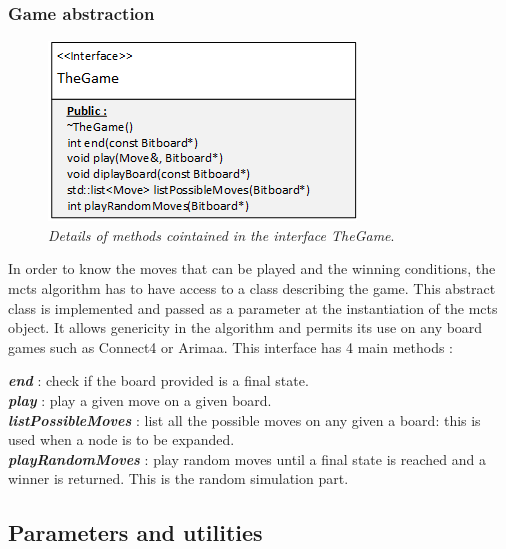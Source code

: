 \subsubsection{Game abstraction}
\begin{figure}[H] 
\centerline{\includegraphics[scale=0.8]{Data_Structure/Img/TheGame.png}}
\caption{\label{fig:thegamedetails}\textit{Details of methods cointained in the interface TheGame}.}
\end{figure}
In order to know the moves that can be played and the winning conditions, the mcts algorithm has to have access to a class describing the game. This abstract class is implemented and passed as a parameter at the instantiation of the mcts object. It allows genericity in the algorithm and permits its use on any board games such as Connect4 or Arimaa. This interface has 4 main methods : 

\noindent
\textit{\textbf{end}} : check if the board provided is a final state.
\medskip\\
\textit{\textbf{play}} : play a given move on a given board.
\medskip\\
\textit{\textbf{listPossibleMoves}} : list all the possible moves on any given a board: this is used when a node is to be expanded.
\medskip\\
\textit{\textbf{playRandomMoves}} : play random moves until a final state is reached and a winner is returned. This is the random simulation part.

\newpage
\subsection{Parameters and utilities}

